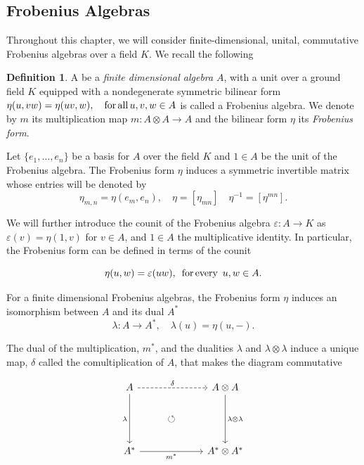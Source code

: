 \documentclass{amsart}
\newcommand{\be}{\begin{equation}}
\newcommand{\ee}{\end{equation}}
\newcommand{\tensor}{\otimes}
\newcommand{\eps}{\varepsilon}
\theoremstyle{definition}
\newtheorem{Def}[Lem]{Definition}
\begin{document}
\subsection{Frobenius Algebras}\label{secFA}
\noindent Throughout this chapter, we will consider finite-dimensional, unital, commutative Frobenius algebras over a field $K$. We recall the following
\begin{Def}\label{def:FA} A be a {\it finite dimensional algebra} $A$, with a unit over a ground field $K$ equipped with a nondegenerate symmetric bilinear form $ \eta(u,vw)=\eta(uv,w),\quad \text{for\,all\,} u,v,w\in A$ is called a Frobenius algebra. We denote by $m$ its multiplication map $m: A\tensor A\to A$ and the bilinear form $\eta$ its {\it Frobenius form}.
\end{Def}

Let $\{e_1,\ldots, e_n\}$ be a basis for $A$ over the field $K$ and $1\in A$ be the unit of the Frobenius algebra. The Frobenius form $\eta$ induces a symmetric invertible matrix whose entries will be denoted by\\
$$\eta_{m,n}=\eta(e_m, e_n), \quad \eta=[\eta_{mn}] \quad \eta^{-1}=[\eta^{mn}].$$

We will further introduce the counit of the Frobenius algebra $\eps:A\to K$ as $\eps(v)=\eta(1,v)$ for $v\in A$, and $1\in A$ the multiplicative identity. In particular, the Frobenius form can be defined in terms of the counit 

$$\eta(u,w)=\eps(uw),\,\text{ for\,every \,} u,w\in A.$$

For a finite dimensional Frobenius algebras, the Frobenius form $\eta$ induces an isomorphism between $A$ and its dual $A^*$
\be\label{eqn:lambdaiso}
\lambda:A\longrightarrow A^*,\quad \lambda(u)=\eta(u,-).
\ee

The dual of the multiplication, $m^*$, and  the dualities $\lambda$ and $\lambda\tensor \lambda$ induce a unique map, $\delta$ called the comultiplication of $A$, that makes the diagram commutative

\be
	\begin{tikzcd}
		A \arrow[dd, "\lambda"'] \arrow[rr, "\delta", dashed] &  & A\otimes A \arrow[dd, "\lambda\otimes\lambda"] \\
		& \circlearrowleft &                                                \\
		A^* \arrow[rr, "m^*"']                                &  & A^*\otimes A^*                                
	\end{tikzcd}
\ee
\end{document}
